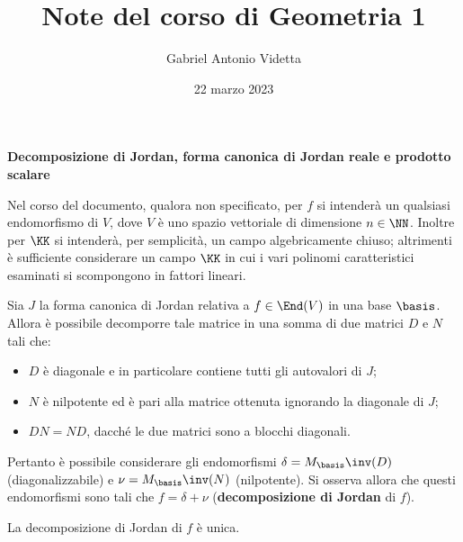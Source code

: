 \documentclass[11pt]{article}
\title{\textbf{Note del corso di Geometria 1}}
\author{Gabriel Antonio Videtta}
\date{22 marzo 2023}
\begin{document}
	
	\maketitle
	
	\begin{center}
		\Large \textbf{Decomposizione di Jordan, forma canonica di Jordan reale e prodotto scalare}
	\end{center}

	\begin{note}
		Nel corso del documento, qualora non specificato, per $f$ si intenderà un qualsiasi
		endomorfismo di $V$, dove $V$ è uno spazio vettoriale di dimensione $n \in \NN$. Inoltre
		per $\KK$ si intenderà, per semplicità, un campo algebricamente chiuso; altrimenti
		è sufficiente considerare un campo $\KK$ in cui i vari polinomi caratteristici esaminati
		si scompongono in fattori lineari.
	\end{note}

	Sia $J$ la forma canonica di Jordan relativa a $f \in \End(V)$ in una base $\basis$. Allora è possibile decomporre
	tale matrice in una somma di due matrici $D$ e $N$ tali che:
	
	\begin{itemize}
		\item $D$ è diagonale e in particolare contiene tutti gli autovalori di $J$;
		\item $N$ è nilpotente ed è pari alla matrice ottenuta ignorando la diagonale di $J$;
		\item $DN = ND$, dacché le due matrici sono a blocchi diagonali.
	\end{itemize}

	Pertanto è possibile considerare gli endomorfismi $\delta = M_\basis\inv(D)$ (diagonalizzabile) e $\nu = M_\basis\inv(N)$ (nilpotente).
	Si osserva allora che questi endomorfismi sono tali che $f = \delta + \nu$ (\textbf{decomposizione di Jordan} di $f$).
	
	\begin{theorem}
		La decomposizione di Jordan di $f$ è unica.
	\end{theorem}
\end{document}
